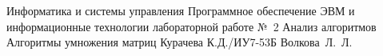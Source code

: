 \documentclass{bmstu}[a4paper]
\begin{document}
	
	\makereporttitle
	{Информатика и системы управления}
	{Программное обеспечение ЭВМ и информационные технологии}
	{лабораторной работе №~2}
	{Анализ алгоритмов}
	{Алгоритмы умножения матриц}
	{}
	{Курачева К.Д./ИУ7-53Б}
	{Волкова~Л.~Л.}
	
	\maketableofcontents
	
	
	
	
	
	
	
	
	\makebibliography
	
	
	
	
\end{document}
